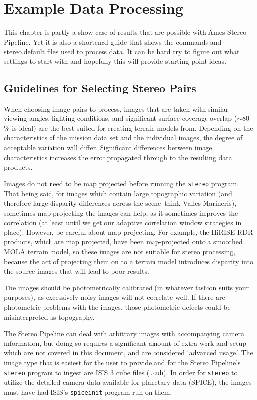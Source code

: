 \chapter{Example Data Processing}

This chapter is partly a show case of results that are possible with
Ames Stereo Pipeline. Yet it is also a shortened guide that shows the
commands and stereo.default files used to process data. It can be hard
try to figure out what settings to start with and hopefully this will
provide starting point ideas.

\section{Guidelines for Selecting Stereo Pairs}

When choosing image pairs to process, images that are taken with
similar viewing angles, lighting conditions, and significant surface
coverage overlap ($\sim80$\% is ideal) are the best suited for
creating terrain models from. Depending on the characteristics of
the mission data set and the individual images, the degree of
acceptable variation will differ. Significant differences between
image characteristics increases the error propagated through to the
resulting data products.

Images do not need to be map projected before running the \texttt{stereo}
program. That being said, for images which contain large topographic
variation (and therefore large disparity differences across the
scene--think Valles Marineris), sometimes map-projecting the images
can help, as it sometimes improves the correlation (at least until
we get our adaptive correlation window strategies in place).  However,
be careful about map-projecting.  For example, the HiRISE RDR
products, which are map projected, have been map-projected onto a
smoothed MOLA terrain model, so these images are not suitable for
stereo processing, because the act of projecting them on to a terrain
model introduces disparity into the source images that will lead
to poor results.

The images should be photometrically calibrated (in whatever fashion
suits your purposes), as excessively noisy images will not correlate
well.  If there are photometric problems with the images, those
photometric defects could be misinterpreted as topography.

The Stereo Pipeline can deal with arbitrary images with accompanying
camera information, but doing so requires a significant amount of
extra work and setup which are not covered in this document, and
are considered `advanced usage.'  The image type that is easiest
for the user to provide and for the Stereo Pipeline's \texttt{stereo}
program to ingest are ISIS 3 cube files (\texttt{.cub}).  In order
for \texttt{stereo} to utilize the detailed camera data available
for planetary data (SPICE), the images must have had ISIS's
\texttt{spiceinit} program run on them.

